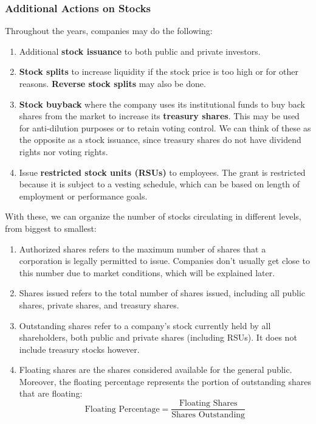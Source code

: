 \documentclass{article}
\begin{document}
\subsubsection{Additional Actions on Stocks}
Throughout the years, companies may do the following: 
\begin{enumerate}
    \item Additional \textbf{stock issuance} to both public and private investors. 
    \item \textbf{Stock splits} to increase liquidity if the stock price is too high or for other reasons. \textbf{Reverse stock splits} may also be done.
    \item \textbf{Stock buyback} where the company uses its institutional funds to buy back shares from the market to increase its \textbf{treasury shares}. This may be used for anti-dilution purposes or to retain voting control. We can think of these as the opposite as a stock issuance, since treasury shares do not have dividend rights nor voting rights. 
    \item Issue \textbf{restricted stock units (RSUs)} to employees. The grant is restricted because it is subject to a vesting schedule, which can be based on length of employment or performance goals.
\end{enumerate}
With these, we can organize the number of stocks circulating in different levels, from biggest to smallest:
\begin{enumerate}
    \item Authorized shares refers to the maximum number of shares that a corporation is legally permitted to issue. Companies don't usually get close to this number due to market conditions, which will be explained later. 
    \item Shares issued refers to the total number of shares issued, including all public shares, private shares, and treasury shares. 
    \item Outstanding shares refer to a company's stock currently held by all shareholders, both public and private shares (including RSUs). It does not include treasury stocks however. 
    \item Floating shares are the shares considered available for the general public. Moreover, the floating percentage represents the portion of outstanding shares that are floating: 
    \[\text{Floating Percentage} = \frac{\text{Floating Shares}}{\text{Shares Outstanding}}\]
\end{enumerate}
\end{document}
